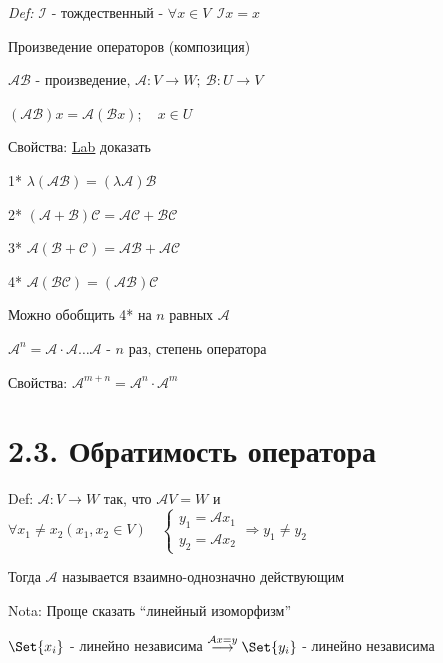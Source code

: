 \documentclass[12pt]{article}
\begin{document}
    \textit{Def:} $\mathcal{I}$ - тождественный - $\forall x \in V \ \ \mathcal{I}x = x$



    \Def Произведение операторов (композиция)

    $\mathcal{A}\mathcal{B}$ - произведение, $\mathcal{A} : V \rightarrow W; \ \mathcal{B} : U \rightarrow V$

    $(\mathcal{A}\mathcal{B}) x = \mathcal{A}(\mathcal{B}x); \quad x \in U$

    \hypertarget{linearoperatorproperties}{}

    Свойства: \underline{Lab} доказать

    1* $\lambda (\mathcal{A}\mathcal{B}) = (\lambda \mathcal{A})\mathcal{B}$

    2* $(\mathcal{A} + \mathcal{B}) \mathcal{C} = \mathcal{A}\mathcal{C} + \mathcal{B}\mathcal{C}$

    3* $\mathcal{A} (\mathcal{B} + \mathcal{C}) = \mathcal{A}\mathcal{B} + \mathcal{A}\mathcal{C}$

    4* $\mathcal{A} (\mathcal{B}\mathcal{C}) = (\mathcal{A}\mathcal{B}) \mathcal{C}$


    \Nota Можно обобщить 4* на $n$ равных $\mathcal{A}$

    \Def $\mathcal{A}^n = \mathcal{A} \cdot \mathcal{A} \dots \mathcal{A}$ - $n$ раз, степень оператора

    Свойства: $\mathcal{A}^{m + n} = \mathcal{A}^n \cdot \mathcal{A}^m$

    \section{2.3. Обратимость оператора}

    \hypertarget{onetoonelinearoperator}{}

    Def: $\mathcal{A} : V \rightarrow W$ так, что $\mathcal{A}V = W$ и $\forall x_1 \neq x_2 (x_1, x_2 \in V) \quad
    \begin{cases}y_1 = \mathcal{A}x_1 \\ y_2 = \mathcal{A}x_2\end{cases} \Longrightarrow y_1 \neq y_2$

    Тогда $\mathcal{A}$ называется взаимно-однозначно действующим

    Nota: Проще сказать \enquote{линейный изоморфизм}

    \Th $\Set{x_i}$ - линейно независима $\stackrel{\mathcal{A}x = y}{\longrightarrow} \Set{y_i}$ - линейно независима
\end{document}
